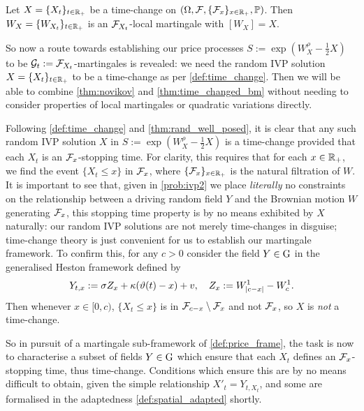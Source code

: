 \begin{theorem}\label{thm:time_changed_bm}
    Let $X=\{X_t\}_{t\in\mathbb{R}_+}$ be a time-change on $(\Omega,\mathcal{F},\{\mathcal{F}_x\}_{x\in\mathbb{R}_+},\mathbb{P})$. Then $W_X=\{W_{X_t}\}_{t\in\mathbb{R}_+}$ is an $\mathcal{F}_{X_t}$-local martingale with $[W_X]=X$.
\end{theorem}

So now a route towards establishing our price processes $S:=\exp(W^\rho_X-\frac12 X)$ to be $\mathcal{G}_t:=\mathcal{F}_{X_t}$-martingales is revealed: we need the random IVP solution $X=\{X_t\}_{t\in\mathbb{R}_+}$ to be a time-change as per \autoref{def:time_change}. Then we will be able to combine \autoref{thm:novikov} and \autoref{thm:time_changed_bm} without needing to consider properties of local martingales or quadratic variations directly.

Following \autoref{def:time_change} and \autoref{thm:rand_well_posed}, it is clear that any such random IVP solution $X$ in $S:=\exp(W^\rho_X-\frac12 X)$ is a time-change provided that each $X_t$ is an $\mathcal{F}_x$-stopping time. For clarity, this requires that for each $x\in\mathbb{R}_+$, we find the event $\{X_t \le x\}$ in $\mathcal{F}_x$, where $\{\mathcal{F}_x\}_{x\in\mathbb{R}_+}$ is the natural filtration of $W$. It is important to see that, given in \autoref{prob:ivp2} we place \emph{literally} no constraints on the relationship between a driving random field $Y$ and the Brownian motion $W$ generating $\mathcal{F}_x$, this stopping time property is by no means exhibited by $X$ naturally: our random IVP solutions are not merely time-changes in disguise; time-change theory is just convenient for us to establish our martingale framework. To confirm this, for any $c>0$ consider the field $Y\in\mathrm{G}$ in the generalised Heston framework defined by
\begin{equation}\label{eq:counterexample_time_change}
    Y_{t,x} := \sigma Z_x + \kappa(\vartheta(t) - x) + v,\quad Z_x := W^1_{|c - x|} - W^1_c.
\end{equation}
Then whenever $x\in[0,c)$, $\{X_t\le x\}$ is in $\mathcal{F}_{c-x}\setminus\mathcal{F}_x$ and not $\mathcal{F}_x$, so $X$ is \emph{not} a time-change.

So in pursuit of a martingale sub-framework of \autoref{def:price_frame}, the task is now to characterise a subset of fields $Y\in\mathrm{G}$ which ensure that each $X_t$ defines an $\mathcal{F}_x$-stopping time, thus time-change. Conditions which ensure this are by no means difficult to obtain, given the simple relationship $X'_t=Y_{t,X_t}$, and some are formalised in the adaptedness \autoref{def:spatial_adapted} shortly.

